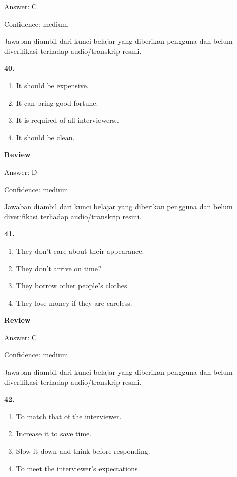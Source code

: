 \documentclass[12pt]{article}
\begin{document}
Answer: C\par
Confidence: medium\par
Jawaban diambil dari kunci belajar yang diberikan pengguna dan belum diverifikasi terhadap audio/transkrip resmi.\par
\endgroup
\par
\vspace{0.25\baselineskip}
\noindent\textbf{40.}
\begin{enumerate}[label=(\Alph*),leftmargin=*,itemsep=0.2em]
\item It should be expensive.
\item It can bring good fortune.
\item It is required of all interviewers..
\item It should be clean.
\end{enumerate}
\par
\begingroup
\setlength{\parskip}{0pt}
\setlength{\parindent}{0pt}
\textbf{Review}\par
Answer: D\par
Confidence: medium\par
Jawaban diambil dari kunci belajar yang diberikan pengguna dan belum diverifikasi terhadap audio/transkrip resmi.\par
\endgroup
\par
\vspace{0.25\baselineskip}
\noindent\textbf{41.}
\begin{enumerate}[label=(\Alph*),leftmargin=*,itemsep=0.2em]
\item They don't care about their appearance.
\item They don't arrive on time?
\item They borrow other people's clothes.
\item They lose money if they are careless.
\end{enumerate}
\par
\begingroup
\setlength{\parskip}{0pt}
\setlength{\parindent}{0pt}
\textbf{Review}\par
Answer: C\par
Confidence: medium\par
Jawaban diambil dari kunci belajar yang diberikan pengguna dan belum diverifikasi terhadap audio/transkrip resmi.\par
\endgroup
\par
\vspace{0.25\baselineskip}
\noindent\textbf{42.}
\begin{enumerate}[label=(\Alph*),leftmargin=*,itemsep=0.2em]
\item To match that of the interviewer.
\item Increase it to save time.
\item Slow it down and think before responding.
\item To meet the interviewer's expectations.
\end{enumerate}
\end{document}
